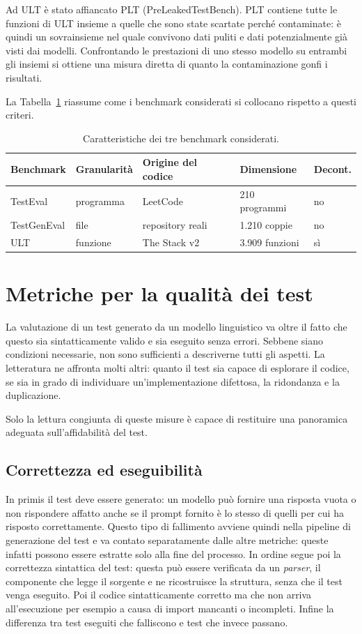 Ad ULT è stato affiancato PLT (PreLeakedTestBench). PLT contiene tutte le funzioni di ULT insieme a quelle che sono state scartate perché contaminate: è quindi un sovrainsieme nel quale convivono dati puliti e dati potenzialmente già visti dai modelli. Confrontando le prestazioni di uno stesso modello su entrambi gli insiemi si ottiene una misura diretta di quanto la contaminazione gonfi i risultati.

La Tabella~\ref{tab:benchmark} riassume come i benchmark considerati si collocano rispetto a questi criteri.
\begin{table}[H]
\centering
\caption{Caratteristiche dei tre benchmark considerati.}
\label{tab:benchmark}
\begin{tabular}{lllll}
\hline
\textbf{Benchmark} & \textbf{Granularità} & \textbf{Origine del codice} & \textbf{Dimensione} & \textbf{Decont.} \\
\hline
TestEval \cite{wang2025testeval} & programma & LeetCode & 210 programmi & no \\
TestGenEval \cite{jain2025testgeneval} & file & repository reali & 1.210 coppie & no \\
ULT \cite{huang2025ult} & funzione & The Stack v2 & 3.909 funzioni & sì \\
\hline
\end{tabular}
\end{table}

\section{Metriche per la qualità dei test}
La valutazione di un test generato da un modello linguistico va oltre il fatto che questo sia sintatticamente valido e sia eseguito senza errori. Sebbene siano condizioni necessarie, non sono sufficienti a descriverne tutti gli aspetti. La letteratura ne affronta molti altri: quanto il test sia capace di esplorare il codice, se sia in grado di individuare un'implementazione difettosa, la ridondanza e la duplicazione.

Solo la lettura congiunta di queste misure è capace di restituire una panoramica adeguata sull'affidabilità del test.


\subsection{Correttezza ed eseguibilità}
\label{sec:passa}
In primis il test deve essere generato: un modello può fornire una risposta vuota o non rispondere affatto anche se il prompt fornito è lo stesso di quelli per cui ha risposto correttamente. Questo tipo di fallimento avviene quindi nella pipeline di generazione del test e va contato separatamente dalle altre metriche: queste infatti possono essere estratte solo alla fine del processo.
In ordine segue poi la correttezza sintattica del test: questa può essere verificata da un \emph{parser}, il componente che legge il sorgente e ne ricostruisce la struttura, senza che il test venga eseguito. Poi il codice sintatticamente corretto ma che non arriva all'esecuzione per esempio a causa di import mancanti o incompleti. Infine la differenza tra test eseguiti che falliscono e test che invece passano.

